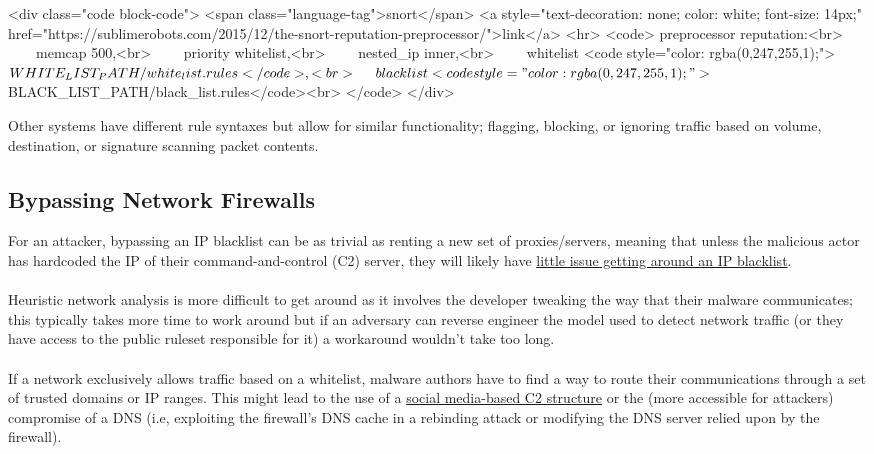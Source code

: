 \begin{rawhtml}
<div class="code block-code">
            <span class="language-tag">snort</span>
            <a style="text-decoration: none; color: white; font-size: 14px;" href="https://sublimerobots.com/2015/12/the-snort-reputation-preprocessor/">link</a>
        <hr>
            <code>
                preprocessor reputation:<br>
                    memcap 500,<br>
                    priority whitelist,<br>
                    nested_ip inner,<br>
                    whitelist <code style="color: rgba(0,247,255,1);">$WHITE_LIST_PATH/white_list.rules</code>,<br>
                    blacklist <code style="color: rgba(0,247,255,1);">$BLACK_LIST_PATH/black_list.rules</code><br>
            </code>
        </div>
\end{rawhtml}

Other systems have different rule syntaxes but allow for similar functionality; flagging, blocking, or ignoring traffic based on
            volume, destination, or signature scanning packet contents.

\subsection{Bypassing Network Firewalls}

For an attacker, bypassing an IP blacklist can be as trivial as renting a new set of proxies/servers,
            meaning that unless the malicious actor has hardcoded the IP of their command-and-control (C2) server, they will likely have
            \href{https://www.semanticscholar.org/paper/On-cloaking-behaviors-of-malicious-websites-Samarasinghe-Mannan/db0ac084bf50550307f981c2971944f2133472c7}{little issue getting around an IP blacklist}.
        \\
\\

            Heuristic network analysis is more difficult to get around as it involves the developer tweaking the way that their malware
            communicates; this typically takes more time to work around but if an adversary can reverse engineer the model used to detect
            network traffic (or they have access to the public ruleset responsible for it) a workaround wouldn't take too long.
        \\
\\

            If a network exclusively allows traffic based on a whitelist, malware authors have to find a way to route their communications
            through a set of trusted domains or IP ranges. This might lead to the use of a \href{https://www.doiserbia.nb.rs/Article.aspx?ID=1451-48692003357R}{social media-based C2 structure}
            or the (more accessible for attackers) compromise of a DNS (i.e, exploiting the firewall's DNS cache in a rebinding attack or
            modifying the DNS server relied upon by the firewall).

